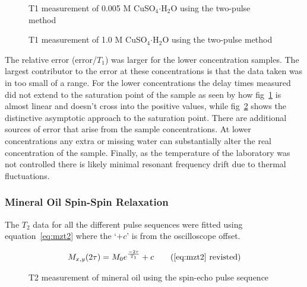 \documentclass[
reprint,
amsmath,amssymb,
aps,
tikz,
border=5pt
]{revtex4-1}
\newcommand*{\tc}[1][1]{$T_#1$ }
\begin{document}
    
    \begin{figure}[t]
        \resizebox{0.45\textwidth}{!}{}
        \caption{T1 measurement of 0.005 M  CuSO$_{4} \boldsymbol{\cdot} $H$_2$O using the two-pulse method }
        \label{fig:0d005_t1}
      \end{figure}
    
      \begin{figure}[b]
        \resizebox{0.45\textwidth}{!}{}
        \caption{T1 measurement of 1.0 M  CuSO$_{4} \boldsymbol{\cdot} $H$_2$O using the two-pulse method }
        \label{fig:1d0_t1}
      \end{figure}
    
    The relative error (error/$T_1$) was larger for the lower concentration samples. The largest contributor to the error at these concentrations is that the data taken was in too small of a range. For the lower concentrations the delay times measured did not extend to the saturation point of the sample as seen by how fig~\ref{fig:0d005_t1} is almost linear and doesn't cross into the positive values, while fig~\ref{fig:1d0_t1} shows the distinctive asymptotic approach to the saturation point. There are additional sources of error that arise from the sample concentrations. At lower concentrations any extra or missing water can substantially alter the real concentration of the sample. Finally, as the temperature of the laboratory was not controlled there is likely minimal resonant frequency drift due to thermal fluctuations. 



\subsubsection*{Mineral Oil Spin-Spin Relaxation}

    
    The \tc[2] data for all the different pulse sequences were fitted using equation~\ref{eq:mzt2} where the `$+c$' is from the oscilloscope offset.
    
    \begin{gather*}
        M_{x,y}(2\tau) = M_0  e^\frac{-2\tau}{T_1} + c \tag{\ref{eq:mzt2} revisted}
    \end{gather*}


    \begin{figure}[t]
        \resizebox{0.45\textwidth}{!}{}
        \caption{T2 measurement of mineral oil using the spin-echo pulse sequence }
        \label{fig:mo_se}
    \end{figure}
\end{document}
